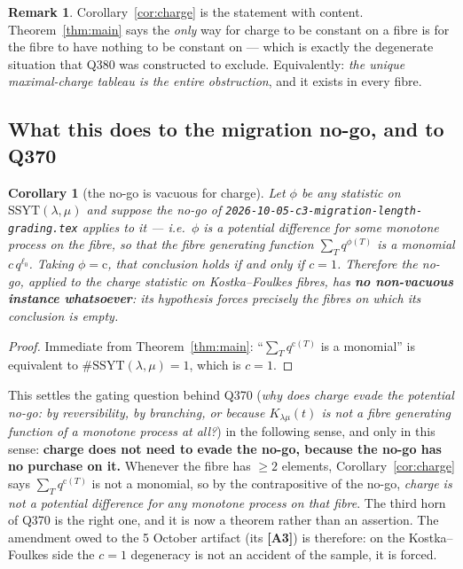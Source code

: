 \documentclass[11pt]{article}
\theoremstyle{plain}
\newtheorem{corollary}[theorem]{Corollary}
\theoremstyle{definition}
\newtheorem{remark}[theorem]{Remark}
\newcommand{\SSYT}{\mathrm{SSYT}}
\newcommand{\charge}{\mathrm{c}}
\begin{document}
\begin{remark}
Corollary~\ref{cor:charge} is the statement with content.  Theorem~\ref{thm:main} says
the \emph{only} way for charge to be constant on a fibre is for the fibre to have nothing
to be constant on --- which is exactly the degenerate situation that Q380 was constructed
to exclude.  Equivalently: \emph{the unique maximal-charge tableau is the entire
obstruction}, and it exists in every fibre.
\end{remark}

\subsection{What this does to the migration no-go, and to Q370}

\begin{corollary}[the no-go is vacuous for charge]\label{cor:nogo}
Let $\phi$ be any statistic on $\SSYT(\lambda,\mu)$ and suppose the no-go of
\texttt{2026-10-05-c3-migration-length-grading.tex} applies to it --- i.e.\ $\phi$ is a
potential difference for some monotone process on the fibre, so that the fibre generating
function $\sum_T q^{\phi(T)}$ is a monomial $c\,q^{\ell_0}$.  Taking $\phi=\charge$, that
conclusion holds \emph{if and only if} $c=1$.  Therefore the no-go, applied to the charge
statistic on Kostka--Foulkes fibres, has \textbf{no non-vacuous instance whatsoever}:
its hypothesis forces precisely the fibres on which its conclusion is empty.
\end{corollary}

\begin{proof}
Immediate from Theorem~\ref{thm:main}: ``$\sum_T q^{\charge(T)}$ is a monomial'' is
equivalent to $\#\SSYT(\lambda,\mu)=1$, which is $c=1$.
\end{proof}

This settles the gating question behind Q370 (\emph{why does charge evade the potential
no-go: by reversibility, by branching, or because $K_{\lambda\mu}(t)$ is not a fibre
generating function of a monotone process at all?}) in the following sense, and only in
this sense: \textbf{charge does not need to evade the no-go, because the no-go has no
purchase on it.}  Whenever the fibre has $\ge 2$ elements, Corollary~\ref{cor:charge}
says $\sum_T q^{\charge(T)}$ is not a monomial, so by the contrapositive of the no-go,
\emph{charge is not a potential difference for any monotone process on that fibre}.  The
third horn of Q370 is the right one, and it is now a theorem rather than an assertion.
The amendment owed to the 5 October artifact (its \textbf{[A3]}) is therefore: on the
Kostka--Foulkes side the $c=1$ degeneracy is not an accident of the sample, it is forced.
\end{document}

